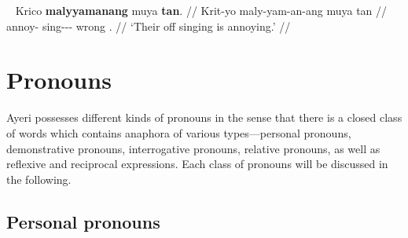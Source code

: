 \ex~\begingl
	\gla Krico \textbf{malyyamanang} muya \textbf{tan}. //
	\glb Krit-yo maly-yam-an-ang muya tan //
	\glc annoy-\TsgN{} sing-\Ptcp{}-\Nmlz{}-\Aarg{} wrong \TplM{}.\Gen{} //
	\glft `Their off singing is annoying.' //
\endgl\xe



\section{Pronouns}

Ayeri possesses different kinds of pronouns in the sense that there is a closed 
class of words which contains anaphora of various types---personal pronouns, 
demonstrative pronouns, interrogative pronouns, relative pronouns, as 
well as reflexive and reciprocal expressions. Each class of pronouns will be 
discussed in the following.

\subsection{Personal pronouns}
\label{subsec:perspro}


